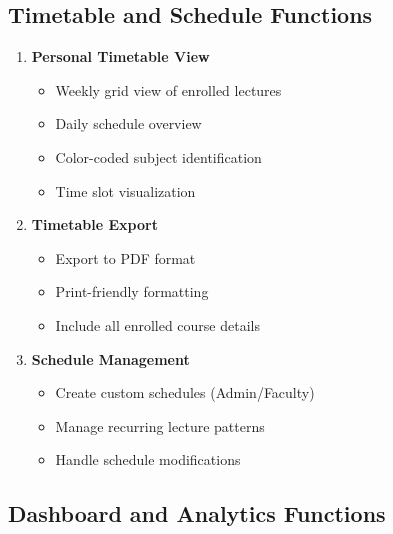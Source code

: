 \documentclass[12pt,a4paper]{report}
\begin{document}
\subsection{Timetable and Schedule Functions}

\begin{enumerate}[leftmargin=*]
    \item \textbf{Personal Timetable View}
    \begin{itemize}
        \item Weekly grid view of enrolled lectures
        \item Daily schedule overview
        \item Color-coded subject identification
        \item Time slot visualization
    \end{itemize}
    
    \item \textbf{Timetable Export}
    \begin{itemize}
        \item Export to PDF format
        \item Print-friendly formatting
        \item Include all enrolled course details
    \end{itemize}
    
    \item \textbf{Schedule Management}
    \begin{itemize}
        \item Create custom schedules (Admin/Faculty)
        \item Manage recurring lecture patterns
        \item Handle schedule modifications
    \end{itemize}
\end{enumerate}

\subsection{Dashboard and Analytics Functions}
\end{document}
